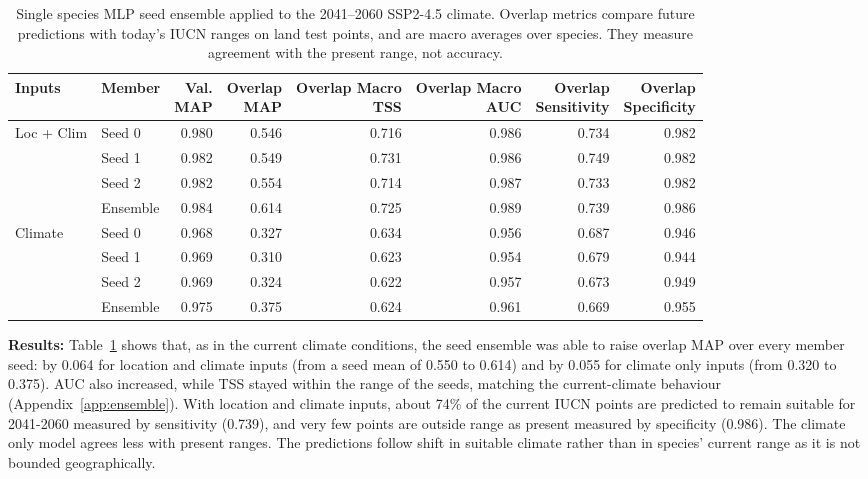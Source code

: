 \documentclass{article}
\begin{document}
\begin{table}[ht]
    \centering
    \small
    \renewcommand{\arraystretch}{0.92}
    \setlength{\aboverulesep}{2pt}
    \setlength{\belowrulesep}{2pt}
    \setlength{\tabcolsep}{2pt}
    \newcommand{\hdr}[1]{\begin{tabular}[b]{@{}r@{}}#1\end{tabular}}
    \begin{tabular*}{\linewidth}{@{\extracolsep{\fill}} llrrrrrr @{}}
        \toprule
        Inputs & Member & \hdr{Val. \\ MAP} & \hdr{Overlap \\ MAP} & \hdr{Overlap Macro \\ TSS} & \hdr{Overlap Macro \\ AUC} & \hdr{Overlap \\ Sensitivity} & \hdr{Overlap \\ Specificity} \\
        \midrule
        \multirow{4}{*}{Loc + Clim}
            & Seed 0   & 0.980 & 0.546 & 0.716 & 0.986 & 0.734 & 0.982 \\
            & Seed 1   & 0.982 & 0.549 & 0.731 & 0.986 & 0.749 & 0.982 \\
            & Seed 2   & 0.982 & 0.554 & 0.714 & 0.987 & 0.733 & 0.982 \\
            & Ensemble & 0.984 & 0.614 & 0.725 & 0.989 & 0.739 & 0.986 \\
        \midrule
        \multirow{4}{*}{Climate}
            & Seed 0   & 0.968 & 0.327 & 0.634 & 0.956 & 0.687 & 0.946 \\
            & Seed 1   & 0.969 & 0.310 & 0.623 & 0.954 & 0.679 & 0.944 \\
            & Seed 2   & 0.969 & 0.324 & 0.622 & 0.957 & 0.673 & 0.949 \\
            & Ensemble & 0.975 & 0.375 & 0.624 & 0.961 & 0.669 & 0.955 \\
        \bottomrule
    \end{tabular*}
    \caption{Single species MLP seed ensemble applied to the 2041--2060 SSP2-4.5 climate. Overlap metrics compare future predictions with today's IUCN ranges on land test points, and are macro averages over species. They measure agreement with the present range, not accuracy.}
    \label{tab:future}
\end{table}

\textbf{Results:} Table~\ref{tab:future} shows that, as in the current climate conditions, the seed ensemble was able to raise overlap MAP over every member seed: by 0.064 for location and climate inputs (from a seed mean of 0.550 to 0.614) and by 0.055 for climate only inputs (from 0.320 to 0.375). AUC also increased, while TSS stayed within the range of the seeds, matching the current-climate behaviour (Appendix~\ref{app:ensemble}). With location and climate inputs, about 74\% of the current IUCN points are predicted to remain suitable for 2041-2060 measured by sensitivity (0.739), and very few points are outside range as present measured by specificity (0.986). The climate only model agrees less with present ranges. The predictions follow shift in suitable climate rather than in species' current range as it is not bounded geographically.
\end{document}
